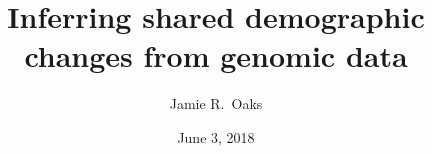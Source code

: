 \title[Shared demographic changes]{
    Inferring shared demographic changes from
    genomic data}

\author[Jamie Oaks]{
    Jamie R.\ Oaks%
}

\date{June 3, 2018}
